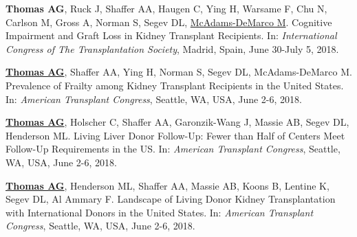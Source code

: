 \documentclass[10pt]{article}
\makeatletter
\newlength{\bibhang}
\newlength{\bibsep}
 {\@listi \global\bibsep\itemsep \global\advance\bibsep by\parsep}
\newenvironment{bibenum*}
  {\renewcommand\labelenumi{[\theenumi]}%
   \etaremune[
     topsep=0pt,
     itemsep=\bibsep,
     parsep=0pt,partopsep=0pt,
     itemindent=-\bibhang,
     leftmargin={\bibhang+\widthof{[999]}}]}
  {\endetaremune}
\makeatother
\begin{document}
\begin{bibenum*}
\item \textbf{Thomas AG}, Ruck J, Shaffer AA, Haugen C, Ying H,
  Warsame F, Chu N, Carlson M, Gross A, Norman S,
  Segev DL, \underline{McAdams-DeMarco M}.
  Cognitive Impairment and Graft Loss in Kidney Transplant Recipients.
  In: \emph{International Congress of The Transplantation Society},
  Madrid, Spain, June 30-July 5, 2018.



\item \underline{\textbf{Thomas AG}}, Shaffer AA, Ying H, Norman S,
  Segev DL, McAdams-DeMarco M.
  Prevalence of Frailty among Kidney Transplant Recipients in the United States.
  In: \emph{American Transplant Congress},
  Seattle, WA, USA, June 2-6, 2018.

\item \underline{\textbf{Thomas AG}}, Holscher C, Shaffer AA,
  Garonzik-Wang J, Massie AB, Segev DL, Henderson ML.
  Living Liver Donor Follow-Up: Fewer than Half of
  Centers Meet Follow-Up Requirements in the US.
  In: \emph{American Transplant Congress},
  Seattle, WA, USA, June 2-6, 2018.

\item \underline{\textbf{Thomas AG}}, Henderson ML, Shaffer AA,
  Massie AB, Koons B, Lentine K, Segev DL, Al Ammary F.
  Landscape of Living Donor Kidney Transplantation with
  International Donors in the United States.
  In: \emph{American Transplant Congress},
  Seattle, WA, USA, June 2-6, 2018.



\end{bibenum*}
\end{document}
